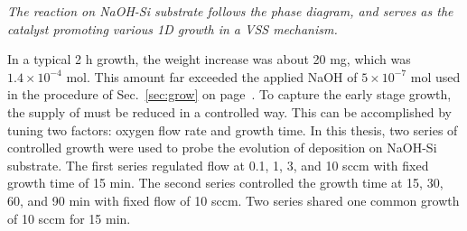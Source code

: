 \emph{The reaction on NaOH-Si substrate follows the phase diagram, and  serves as the catalyst promoting various 1D  growth in a VSS mechanism.}

In a typical 2 h growth, the  weight increase was about 20 mg, which was $1.4\times 10^{-4}$ mol. This amount far exceeded the applied NaOH of $5\times 10^{-7}$ mol used in the procedure of Sec.~\ref{sec:grow} on page~\pageref{sec:grow}. To capture the early stage growth, the supply of  must be reduced in a controlled way. This can be accomplished by tuning two factors: oxygen flow rate and growth time. In this thesis, two series of controlled growth were used to probe the evolution of  deposition on NaOH-Si substrate. The first series regulated  flow at 0.1, 1, 3, and 10 sccm with fixed growth time of 15 min. The second series controlled the growth time at 15, 30, 60, and 90 min with fixed  flow of 10 sccm. Two series shared one common growth of 10 sccm  for 15 min. 

